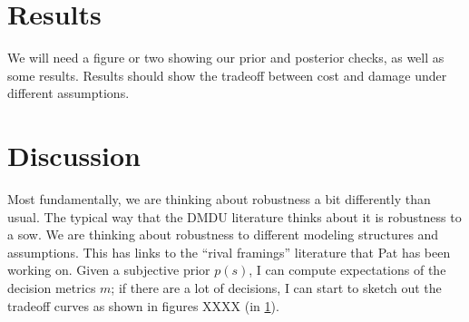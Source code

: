 \documentclass[12pt]{article}
\begin{document}
\section{Results}\label{sec:results}

We will need a figure or two showing our prior and posterior checks, as well as some results.
Results should show the tradeoff between cost and damage under different assumptions.

\section{Discussion}

Most fundamentally, we are thinking about robustness a bit differently than usual.
The typical way that the DMDU literature thinks about it is robustness to a \gls{sow}.
We are thinking about robustness to different modeling structures and assumptions.
This has links to the ``rival framings'' literature that Pat has been working on.
Given a subjective prior $p(s)$, I can compute expectations of the decision metrics $m$; if there are a lot of decisions, I can start to sketch out the tradeoff curves as shown in figures XXXX (in \cref{sec:results}).
\end{document}
